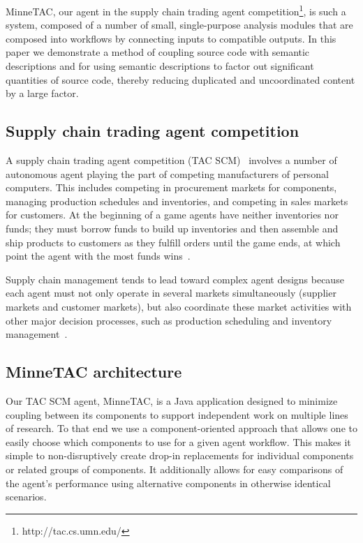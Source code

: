 \documentclass{article}
\begin{document}
MinneTAC, our agent in the supply chain trading agent competition\footnote{http://tac.cs.umn.edu/}, is such a system, composed of a number of small, single-purpose analysis modules that are composed into workflows by connecting inputs to compatible outputs.
In this paper we demonstrate a method of coupling source code with semantic descriptions and for using semantic descriptions to factor out significant quantities of source code, thereby reducing duplicated and uncoordinated content by a large factor.

\subsection{Supply chain trading agent competition}

A supply chain trading agent competition (TAC SCM)~\cite{Collins06a} involves a number of autonomous agent playing the part of competing manufacturers of personal computers.
This includes competing in procurement markets for components, managing production schedules and inventories, and competing in sales markets for customers.
At the beginning of a game agents have neither inventories nor funds; they must borrow funds to build up inventories and then assemble and ship products to customers as they fulfill orders until the game ends, at which point the agent with the most funds wins~\cite{Collins08ECRA}.

Supply chain management tends to lead toward complex agent designs because each agent must not only operate in several markets simultaneously (supplier markets and customer markets), but also coordinate these market activities with other major decision processes, such as production scheduling and inventory management~\cite{Ketter08TADAbook}.

\subsection{MinneTAC architecture}

Our TAC SCM agent, MinneTAC, is a Java application designed to minimize coupling between its components to support independent work on multiple lines of research.
To that end we use a component-oriented approach that allows one to easily choose which components to use for a given agent workflow.
This makes it simple to non-disruptively create drop-in replacements for individual components or related groups of components.
It additionally allows for easy comparisons of the agent's performance using alternative components in otherwise identical scenarios.
\end{document}

